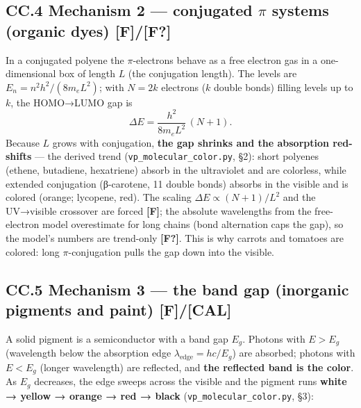 \documentclass[
  10pt,
]{article}
\begin{document}
\hypertarget{cc.4-mechanism-2-conjugated-pi-systems-organic-dyes-ff}{%
\subsection{\texorpdfstring{CC.4 Mechanism 2 --- conjugated \(\pi\)
systems (organic dyes)
\textbf{{[}F{]}/{[}F?{]}}}{CC.4 Mechanism 2 --- conjugated \textbackslash pi systems (organic dyes) {[}F{]}/{[}F?{]}}}\label{cc.4-mechanism-2-conjugated-pi-systems-organic-dyes-ff}}

In a conjugated polyene the \(\pi\)-electrons behave as a free electron
gas in a one-dimensional box of length \(L\) (the conjugation length).
The levels are \(E_n = n^2 h^2/(8 m_e L^2)\); with \(N = 2k\) electrons
(\(k\) double bonds) filling levels up to \(k\), the HOMO→LUMO gap is
\[ \Delta E = \frac{h^2}{8 m_e L^2}\,(N+1). \] Because \(L\) grows with
conjugation, \textbf{the gap shrinks and the absorption red-shifts} ---
the derived trend (\texttt{vp\_molecular\_color.py}, §2): short polyenes
(ethene, butadiene, hexatriene) absorb in the ultraviolet and are
colorless, while extended conjugation (β-carotene, 11 double bonds)
absorbs in the visible and is colored (orange; lycopene, red). The
scaling \(\Delta E \propto (N+1)/L^2\) and the UV→visible crossover are
forced \textbf{{[}F{]}}; the absolute wavelengths from the free-electron
model overestimate for long chains (bond alternation caps the gap), so
the model's numbers are trend-only \textbf{{[}F?{]}}. This is why
carrots and tomatoes are colored: long \(\pi\)-conjugation pulls the gap
down into the visible.

\hypertarget{cc.5-mechanism-3-the-band-gap-inorganic-pigments-and-paint-fcal}{%
\subsection{\texorpdfstring{CC.5 Mechanism 3 --- the band gap (inorganic
pigments and paint)
\textbf{{[}F{]}/{[}CAL{]}}}{CC.5 Mechanism 3 --- the band gap (inorganic pigments and paint) {[}F{]}/{[}CAL{]}}}\label{cc.5-mechanism-3-the-band-gap-inorganic-pigments-and-paint-fcal}}

A solid pigment is a semiconductor with a band gap \(E_g\). Photons with
\(E > E_g\) (wavelength below the absorption edge
\(\lambda_{\text{edge}} = hc/E_g\)) are absorbed; photons with
\(E < E_g\) (longer wavelength) are reflected, and \textbf{the reflected
band is the color}. As \(E_g\) decreases, the edge sweeps across the
visible and the pigment runs \textbf{white → yellow → orange → red →
black} (\texttt{vp\_molecular\_color.py}, §3):
\end{document}

